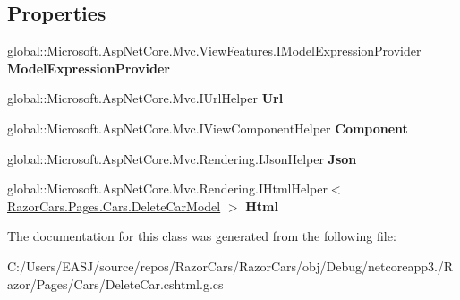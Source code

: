 \subsection*{Properties}
\begin{DoxyCompactItemize}
\item 
\mbox{\label{class_razor_cars_1_1_pages_1_1_cars_1_1_pages___cars___delete_car_a256c495357b8f6b6c6ee81e26162635b}} 
global\+::\+Microsoft.\+Asp\+Net\+Core.\+Mvc.\+View\+Features.\+I\+Model\+Expression\+Provider {\bfseries Model\+Expression\+Provider}
\item 
\mbox{\label{class_razor_cars_1_1_pages_1_1_cars_1_1_pages___cars___delete_car_a7672e0b69938edeb37116124cf439bdb}} 
global\+::\+Microsoft.\+Asp\+Net\+Core.\+Mvc.\+I\+Url\+Helper {\bfseries Url}
\item 
\mbox{\label{class_razor_cars_1_1_pages_1_1_cars_1_1_pages___cars___delete_car_ac68e6e09b3699f7832c52b240f2698df}} 
global\+::\+Microsoft.\+Asp\+Net\+Core.\+Mvc.\+I\+View\+Component\+Helper {\bfseries Component}
\item 
\mbox{\label{class_razor_cars_1_1_pages_1_1_cars_1_1_pages___cars___delete_car_a39c5f12112562104513910cce08f727a}} 
global\+::\+Microsoft.\+Asp\+Net\+Core.\+Mvc.\+Rendering.\+I\+Json\+Helper {\bfseries Json}
\item 
\mbox{\label{class_razor_cars_1_1_pages_1_1_cars_1_1_pages___cars___delete_car_a63fc3ee22037c49ccb25570dfc782bda}} 
global\+::\+Microsoft.\+Asp\+Net\+Core.\+Mvc.\+Rendering.\+I\+Html\+Helper$<$ \mbox{\hyperlink{class_razor_cars_1_1_pages_1_1_cars_1_1_delete_car_model}{Razor\+Cars.\+Pages.\+Cars.\+Delete\+Car\+Model}} $>$ {\bfseries Html}
\end{DoxyCompactItemize}


The documentation for this class was generated from the following file\+:\begin{DoxyCompactItemize}
\item 
C\+:/\+Users/\+E\+A\+S\+J/source/repos/\+Razor\+Cars/\+Razor\+Cars/obj/\+Debug/netcoreapp3./\+Razor/\+Pages/\+Cars/Delete\+Car.\+cshtml.\+g.\+cs\end{DoxyCompactItemize}
